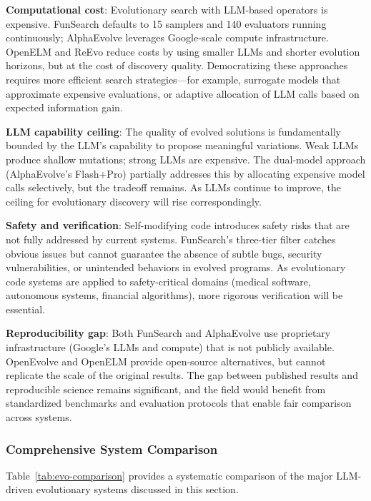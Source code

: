 \textbf{Computational cost}: Evolutionary search with LLM-based operators is expensive. FunSearch defaults to 15 samplers and 140 evaluators running continuously; AlphaEvolve leverages Google-scale compute infrastructure. OpenELM and ReEvo reduce costs by using smaller LLMs and shorter evolution horizons, but at the cost of discovery quality. Democratizing these approaches requires more efficient search strategies---for example, surrogate models that approximate expensive evaluations, or adaptive allocation of LLM calls based on expected information gain.

\textbf{LLM capability ceiling}: The quality of evolved solutions is fundamentally bounded by the LLM's capability to propose meaningful variations. Weak LLMs produce shallow mutations; strong LLMs are expensive. The dual-model approach (AlphaEvolve's Flash+Pro) partially addresses this by allocating expensive model calls selectively, but the tradeoff remains. As LLMs continue to improve, the ceiling for evolutionary discovery will rise correspondingly.

\textbf{Safety and verification}: Self-modifying code introduces safety risks that are not fully addressed by current systems. FunSearch's three-tier filter catches obvious issues but cannot guarantee the absence of subtle bugs, security vulnerabilities, or unintended behaviors in evolved programs. As evolutionary code systems are applied to safety-critical domains (medical software, autonomous systems, financial algorithms), more rigorous verification will be essential.

\textbf{Reproducibility gap}: Both FunSearch and AlphaEvolve use proprietary infrastructure (Google's LLMs and compute) that is not publicly available. OpenEvolve and OpenELM provide open-source alternatives, but cannot replicate the scale of the original results. The gap between published results and reproducible science remains significant, and the field would benefit from standardized benchmarks and evaluation protocols that enable fair comparison across systems.

\subsubsection{Comprehensive System Comparison}

Table~\ref{tab:evo-comparison} provides a systematic comparison of the major LLM-driven evolutionary systems discussed in this section.

